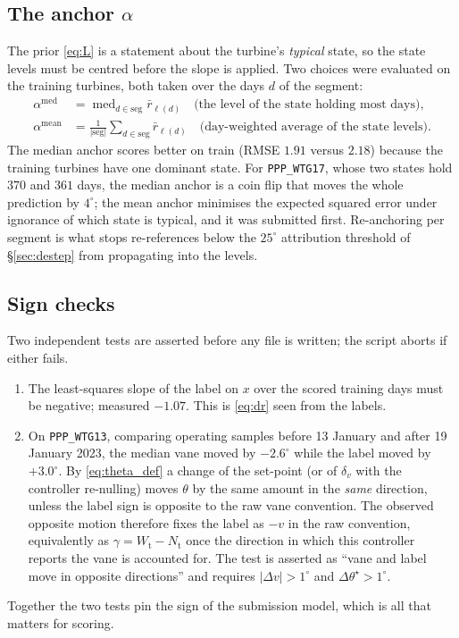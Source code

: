 \documentclass[11pt,a4paper]{article}
\theoremstyle{remark}
\newcommand{\med}{\operatorname{med}}
\newcommand{\dg}{^{\circ}}
\newcommand{\code}[1]{\texttt{#1}}
\newcommand{\Wt}{W_{\mathrm{t}}}
\newcommand{\Nt}{N_{\mathrm{t}}}
\begin{document}
\subsection{The anchor $\alpha$}
The prior \eqref{eq:L} is a statement about the turbine's \emph{typical} state,
so the state levels must be centred before the slope is applied. Two choices
were evaluated on the training turbines, both taken over the days $d$ of the
segment:
\begin{align}
  \alpha^{\mathrm{med}} &= \med_{d\in\mathrm{seg}} \bar r_{\ell(d)}
  \quad\text{(the level of the state holding most days),}\\
  \alpha^{\mathrm{mean}} &= \frac{1}{|\mathrm{seg}|}\sum_{d\in\mathrm{seg}} \bar r_{\ell(d)}
  \quad\text{(day-weighted average of the state levels).}
\end{align}
The median anchor scores better on train (RMSE $1.91$ versus $2.18$) because the
training turbines have one dominant state. For \code{PPP\_WTG17}, whose two
states hold $370$ and $361$ days, the median anchor is a coin flip that moves the
whole prediction by $4\dg$; the mean anchor minimises the expected squared
error under ignorance of which state is typical, and it was submitted first.
Re-anchoring per segment is what stops re-references below the $25\dg$
attribution threshold of \S\ref{sec:destep} from propagating into the levels.

\subsection{Sign checks}\label{sec:signcheck}
Two independent tests are asserted before any file is written; the script
aborts if either fails.
\begin{enumerate}
\item The least-squares slope of the label on $x$ over the scored training days
      must be negative; measured $-1.07$. This is \eqref{eq:dr} seen from the
      labels.
\item On \code{PPP\_WTG13}, comparing operating samples before 13 January and
      after 19 January 2023, the median vane moved by $-2.6\dg$ while the label
      moved by $+3.0\dg$. By \eqref{eq:theta_def} a change of the set-point (or
      of $\delta_v$ with the controller re-nulling) moves $\theta$ by the same
      amount in the \emph{same} direction, unless the label sign is opposite to
      the raw vane convention. The observed opposite motion therefore fixes the
      label as $-v$ in the raw convention, equivalently as $\gamma=\Wt-\Nt$ once
      the direction in which this controller reports the vane is accounted for.
      The test is asserted as ``vane and label move in opposite directions'' and
      requires $|\Delta v|>1\dg$ and $\Delta\theta^\star>1\dg$.
\end{enumerate}
Together the two tests pin the sign of the submission model, which is all that
matters for scoring.
\end{document}
